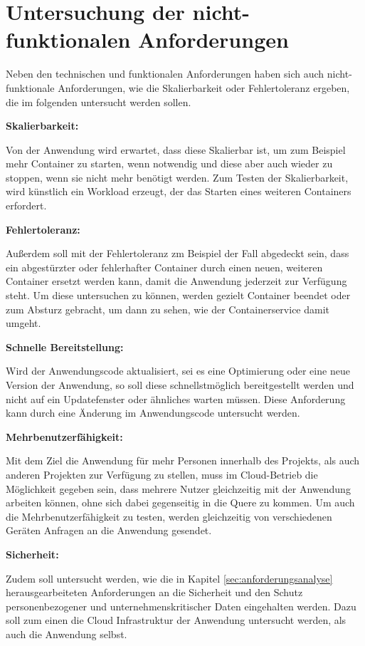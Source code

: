 \section{Untersuchung der nicht-funktionalen Anforderungen}
Neben den technischen und funktionalen Anforderungen haben sich auch nicht-funktionale Anforderungen, wie die Skalierbarkeit oder Fehlertoleranz ergeben, die im folgenden untersucht werden sollen.

\textbf{Skalierbarkeit:}

Von der Anwendung wird erwartet, dass diese Skalierbar ist, um zum Beispiel mehr Container zu starten, wenn notwendig und diese aber auch wieder zu stoppen, wenn sie nicht mehr benötigt werden. Zum Testen der Skalierbarkeit, wird künstlich ein Workload erzeugt, der das Starten eines weiteren Containers erfordert.

\textbf{Fehlertoleranz:}

Außerdem soll mit der Fehlertoleranz zm Beispiel der Fall abgedeckt sein, dass ein abgestürzter oder fehlerhafter Container durch einen neuen, weiteren Container ersetzt werden kann, damit die Anwendung jederzeit zur Verfügung steht. Um diese untersuchen zu können, werden gezielt Container beendet oder zum Absturz gebracht, um dann zu sehen, wie der Containerservice damit umgeht.

\textbf{Schnelle Bereitstellung:}

Wird der Anwendungscode aktualisiert, sei es eine Optimierung oder eine neue Version der Anwendung, so soll diese schnellstmöglich bereitgestellt werden und nicht auf ein Updatefenster oder ähnliches warten müssen. Diese Anforderung kann durch eine Änderung im Anwendungscode untersucht werden.

\textbf{Mehrbenutzerfähigkeit:}

Mit dem Ziel die Anwendung für mehr Personen innerhalb des Projekts, als auch anderen Projekten zur Verfügung zu stellen, muss im Cloud-Betrieb die Möglichkeit gegeben sein, dass mehrere Nutzer gleichzeitig mit der Anwendung arbeiten können, ohne sich dabei gegenseitig in die Quere zu kommen. Um auch die Mehrbenutzerfähigkeit zu testen, werden gleichzeitig von verschiedenen Geräten Anfragen an die Anwendung gesendet.

\textbf{Sicherheit:}

Zudem soll untersucht werden, wie die in Kapitel \ref{sec:anforderungsanalyse} herausgearbeiteten Anforderungen an die Sicherheit und den Schutz personenbezogener und unternehmenskritischer Daten eingehalten werden. Dazu soll zum einen die Cloud Infrastruktur der Anwendung untersucht werden, als auch die Anwendung selbst. \pagebreak

